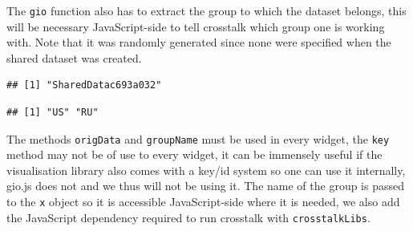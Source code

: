 \documentclass[
]{krantz}
\makeatletter
\newenvironment{Shaded}{\begin{snugshade}}{\end{snugshade}}
\newcommand{\CommentTok}[1]{\textcolor[rgb]{0.37,0.37,0.37}{\textit{#1}}}
\newcommand{\KeywordTok}[1]{\textcolor[rgb]{0.27,0.27,0.27}{\textbf{#1}}}
\newcommand{\NormalTok}[1]{#1}
\newcommand{\OperatorTok}[1]{\textcolor[rgb]{0.43,0.43,0.43}{\textbf{#1}}}
\newenvironment{kframe}{%
\medskip{}
\setlength{\fboxsep}{.8em}
 \def\at@end@of@kframe{}%
 \ifinner\ifhmode%
  \def\at@end@of@kframe{\end{minipage}}%
  \begin{minipage}{\columnwidth}%
 \fi\fi%
 \def\FrameCommand##1{\hskip\@totalleftmargin \hskip-\fboxsep
 \colorbox{shadecolor}{##1}\hskip-\fboxsep
     \hskip-\linewidth \hskip-\@totalleftmargin \hskip\columnwidth}%
 \MakeFramed {\advance\hsize-\width
   \@totalleftmargin\z@ \linewidth\hsize
   \@setminipage}}%
 {\par\unskip\endMakeFramed%
 \at@end@of@kframe}
\renewenvironment{Shaded}{\begin{kframe}}{\end{kframe}}
\makeatother
\begin{document}
The \texttt{gio} function also has to extract the group to which the dataset belongs, this will be necessary JavaScript-side to tell crosstalk which group one is working with. Note that it was randomly generated since none were specified when the shared dataset was created.

\begin{Shaded}
\end{Shaded}

\begin{verbatim}
## [1] "SharedDatac693a032"
\end{verbatim}

\begin{Shaded}
\end{Shaded}

\begin{verbatim}
## [1] "US" "RU"
\end{verbatim}

The methods \texttt{origData} and \texttt{groupName} must be used in every widget, the \texttt{key} method may not be of use to every widget, it can be immensely useful if the visualisation library also comes with a key/id system so one can use it internally, gio.js does not and we thus will not be using it. The name of the group is passed to the \texttt{x} object so it is accessible JavaScript-side where it is needed, we also add the JavaScript dependency required to run crosstalk with \texttt{crosstalkLibs}.
\end{document}
